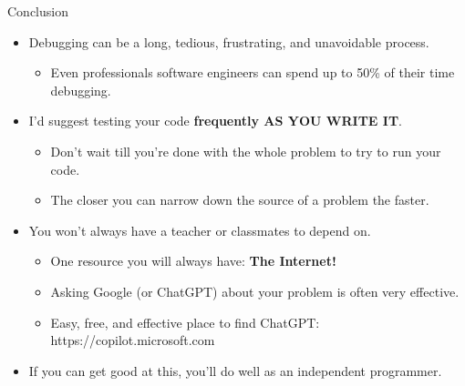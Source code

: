 \documentclass[10pt, aspectratio=169]{beamer}
\begin{document}
\begin{frame}{Conclusion}
    \begin{itemize}
        \item Debugging can be a long, tedious, frustrating, and unavoidable process. 
        \begin{itemize}
            \item Even professionals software engineers can spend up to 50\% of their time debugging.
        \end{itemize}
        \item I'd suggest testing your code \textbf{frequently AS YOU WRITE IT}.
        \begin{itemize}
            \item Don't wait till you're done with the whole problem to try to run your code.
            \item The closer you can narrow down the source of a problem the faster.
        \end{itemize}
        \vspace{0.5cm}
        \item You won't always have a teacher or classmates to depend on.
        \begin{itemize}
            \item One resource you will always have: \textbf{The Internet!}
            \item Asking Google (or ChatGPT) about your problem is often very effective.
            \item Easy, free, and effective place to find ChatGPT: https://copilot.microsoft.com
        \end{itemize}
        \item If you can get good at this, you'll do well as an independent programmer.
    \end{itemize}
\end{frame}
\end{document}
